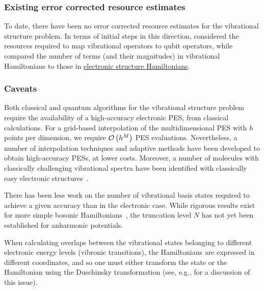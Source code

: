 \begin{refsection}
\subsubsection*{Existing error corrected resource estimates}
To date, there have been no error corrected resource estimates for the vibrational structure problem. In terms of initial steps in this direction, \cite{sawaya2020ResourceEfficientQuantumDLevel} considered the resources required to map vibrational operators to qubit operators, while~\cite{sawaya2021NearLongTermQuantumVibrationalSpectroscopy} compared the number of terms (and their magnitudes) in vibrational Hamiltonians to those in \hyperref[appl:ElectronicStructure]{electronic structure Hamiltonians}. 

\subsubsection*{Caveats}
Both classical and quantum algorithms for the vibrational structure problem require the availability of a high-accuracy electronic PES, from classical calculations. For a grid-based interpolation of the multidimensional PES with $h$ points per dimension, we require $\mathcal{O}\left( h^M \right)$ PES evaluations.  Nevertheless, a number of interpolation techniques and adaptive methods have been developed to obtain high-accuracy PESs, at lower costs. Moreover, a number of molecules with classically challenging vibrational spectra have been identified with classically easy electronic structures~\cite{sawaya2021NearLongTermQuantumVibrationalSpectroscopy}.

There has been less work on the number of vibrational basis states required to achieve a given accuracy than in the electronic case. While rigorous results exist for more simple bosonic Hamiltonians~\cite{tong2021ProvablyAccurateGaugeTheoryBosonicSystems}, the truncation level $N$ has not yet been established for anharmonic potentials. 

When calculating overlaps between the vibrational states belonging to different electronic energy levels (vibronic transitions), the Hamiltonians are expressed in different coordinates, and so one must either transform the state or the Hamiltonian using the Duschinsky transformation (see, e.g., \cite{Huh2015VibrationBosonSampling, mcardle2019VibrationalSim} for a discussion of this issue).




\end{refsection}
